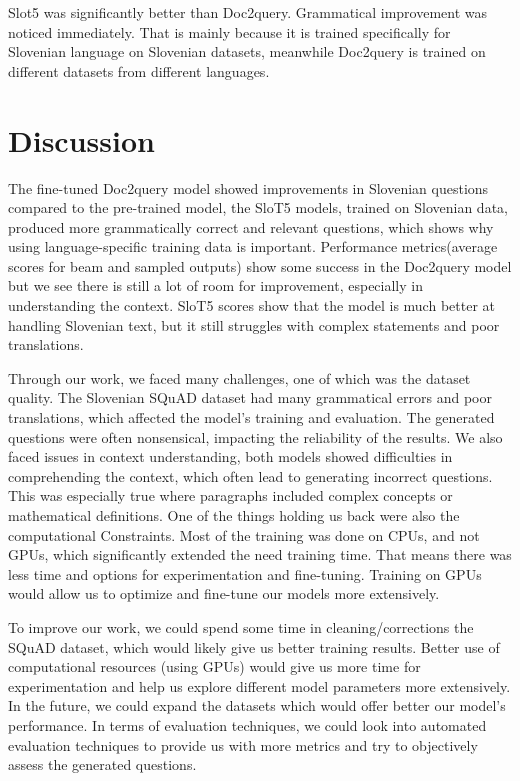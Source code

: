 \documentclass[fleqn,moreauthors,10pt]{ds_report}
\begin{document}
Slot5 was significantly better than Doc2query. Grammatical improvement was noticed immediately. That is mainly because it is trained specifically for Slovenian language on Slovenian datasets, meanwhile Doc2query is trained on different datasets from different languages.




\section*{Discussion}

The fine-tuned Doc2query model showed improvements in Slovenian questions compared to the pre-trained model, the SloT5 models, trained on Slovenian data, produced more grammatically correct and relevant questions, which shows why using language-specific training data is important. Performance metrics(average scores for beam and sampled outputs) show some success in the Doc2query model but we see there is still a lot of room for improvement, especially in understanding the context. SloT5 scores show that the model is much better at handling Slovenian text, but it still struggles with complex statements and poor translations.

Through our work, we faced many challenges, one of which was the dataset quality. The Slovenian SQuAD dataset had many grammatical errors and poor translations, which affected the model's training and evaluation. The generated questions were often nonsensical, impacting the reliability of the results.  We also faced issues in context understanding, both models showed difficulties in comprehending the context, which often lead to generating incorrect questions. This was especially true where paragraphs included complex concepts or mathematical definitions. One of the things holding us back were also the computational Constraints. Most of the training was done on CPUs, and not GPUs, which significantly extended the need training time. That means there was less time and options for experimentation and fine-tuning. Training on GPUs would allow us to optimize and fine-tune our models more extensively.

To improve our work, we could spend some time in cleaning/corrections the SQuAD dataset, which would likely give us better training results.  Better use of computational resources (using GPUs) would give us more time for experimentation and help us explore different model parameters more extensively. In the future, we could expand the datasets which would offer better our model's performance. In terms of evaluation techniques, we could look into automated evaluation techniques to provide us with more metrics and try to objectively assess the generated questions.
\end{document}

